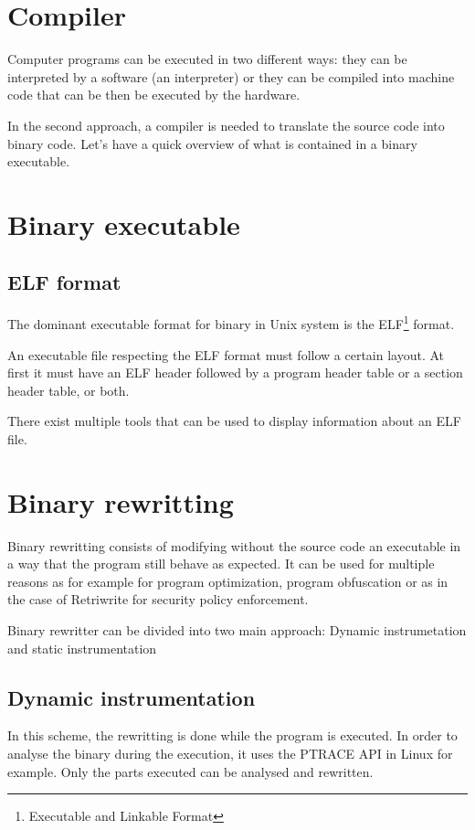 \documentclass[a4paper,11pt,oneside]{report}
\begin{document}
\section{Compiler}
Computer programs can be executed in two different ways: they can be interpreted
by a software (an interpreter) or they can be compiled into machine code that can
be then be executed by the hardware.

In the second approach, a compiler is needed to translate the source code into binary code.
Let's have a quick overview of what is contained in a binary executable.

\section{Binary executable}
\subsection{ELF format}
The dominant executable format for binary in Unix system is the ELF\footnote{Executable
and Linkable Format} format. 

An executable file respecting the ELF format must follow a certain layout. At
first it must have an ELF header followed by a program header table or a section
header table, or both. 

There exist multiple tools that can be used to display information about an ELF file. 

\section{Binary rewritting}
Binary rewritting consists of modifying without the source code an executable
in a way that the program still behave as expected. It can be used for multiple
reasons as for example for program optimization, program obfuscation or as in
the case of Retriwrite for security policy enforcement. 

Binary rewritter can be divided into two main approach: Dynamic instrumetation
and static instrumentation

\subsection{Dynamic instrumentation}
In this scheme, the rewritting is done while the program is executed. In order
to analyse the binary during the execution, it uses the PTRACE API in Linux for
example.  Only the parts executed can be analysed and rewritten.
\end{document}
